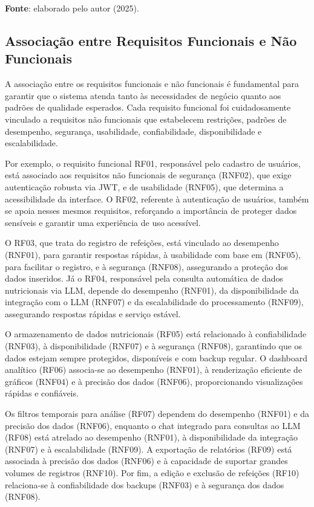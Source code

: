 \begin{center}
    \small{\textbf{Fonte}: elaborado pelo autor (2025).}
\end{center}

\subsection{Associação entre Requisitos Funcionais e Não Funcionais}

A associação entre os requisitos funcionais e não funcionais é fundamental para garantir que o sistema atenda tanto às necessidades de negócio quanto aos padrões de qualidade esperados. Cada requisito funcional foi cuidadosamente vinculado a requisitos não funcionais que estabelecem restrições, padrões de desempenho, segurança, usabilidade, confiabilidade, disponibilidade e escalabilidade.

Por exemplo, o requisito funcional RF01, responsável pelo cadastro de usuários, está associado aos requisitos não funcionais de segurança (RNF02), que exige autenticação robusta via JWT, e de usabilidade (RNF05), que determina a acessibilidade da interface. O RF02, referente à autenticação de usuários, também se apoia nesses mesmos requisitos, reforçando a importância de proteger dados sensíveis e garantir uma experiência de uso acessível.

O RF03, que trata do registro de refeições, está vinculado ao desempenho (RNF01), para garantir respostas rápidas, à usabilidade com base em  (RNF05), para facilitar o registro, e à segurança (RNF08), assegurando a proteção dos dados inseridos. Já o RF04, responsável pela consulta automática de dados nutricionais via LLM, depende do desempenho (RNF01), da disponibilidade da integração com o LLM (RNF07) e da escalabilidade do processamento (RNF09), assegurando respostas rápidas e serviço estável.

O armazenamento de dados nutricionais (RF05) está relacionado à confiabilidade (RNF03), à disponibilidade (RNF07) e à segurança (RNF08), garantindo que os dados estejam sempre protegidos, disponíveis e com backup regular. O dashboard analítico (RF06) associa-se ao desempenho (RNF01), à renderização eficiente de gráficos (RNF04) e à precisão dos dados (RNF06), proporcionando visualizações rápidas e confiáveis.

Os filtros temporais para análise (RF07) dependem do desempenho (RNF01) e da precisão dos dados (RNF06), enquanto o chat integrado para consultas ao LLM (RF08) está atrelado ao desempenho (RNF01), à disponibilidade da integração (RNF07) e à escalabilidade (RNF09). A exportação de relatórios (RF09) está associada à precisão dos dados (RNF06) e à capacidade de suportar grandes volumes de registros (RNF10). Por fim, a edição e exclusão de refeições (RF10) relaciona-se à confiabilidade dos backups (RNF03) e à segurança dos dados (RNF08).

